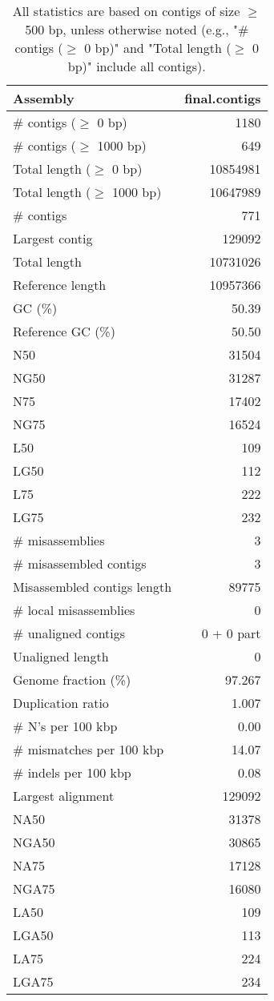\documentclass[12pt,a4paper]{article}
\begin{document}
\begin{table}[ht]
\begin{center}
\caption{All statistics are based on contigs of size $\geq$ 500 bp, unless otherwise noted (e.g., "\# contigs ($\geq$ 0 bp)" and "Total length ($\geq$ 0 bp)" include all contigs).}
\begin{tabular}{|l*{1}{|r}|}
\hline
Assembly & final.contigs \\ \hline
\# contigs ($\geq$ 0 bp) & 1180 \\ \hline
\# contigs ($\geq$ 1000 bp) & 649 \\ \hline
Total length ($\geq$ 0 bp) & 10854981 \\ \hline
Total length ($\geq$ 1000 bp) & 10647989 \\ \hline
\# contigs & 771 \\ \hline
Largest contig & 129092 \\ \hline
Total length & 10731026 \\ \hline
Reference length & 10957366 \\ \hline
GC (\%) & 50.39 \\ \hline
Reference GC (\%) & 50.50 \\ \hline
N50 & 31504 \\ \hline
NG50 & 31287 \\ \hline
N75 & 17402 \\ \hline
NG75 & 16524 \\ \hline
L50 & 109 \\ \hline
LG50 & 112 \\ \hline
L75 & 222 \\ \hline
LG75 & 232 \\ \hline
\# misassemblies & 3 \\ \hline
\# misassembled contigs & 3 \\ \hline
Misassembled contigs length & 89775 \\ \hline
\# local misassemblies & 0 \\ \hline
\# unaligned contigs & 0 + 0 part \\ \hline
Unaligned length & 0 \\ \hline
Genome fraction (\%) & 97.267 \\ \hline
Duplication ratio & 1.007 \\ \hline
\# N's per 100 kbp & 0.00 \\ \hline
\# mismatches per 100 kbp & 14.07 \\ \hline
\# indels per 100 kbp & 0.08 \\ \hline
Largest alignment & 129092 \\ \hline
NA50 & 31378 \\ \hline
NGA50 & 30865 \\ \hline
NA75 & 17128 \\ \hline
NGA75 & 16080 \\ \hline
LA50 & 109 \\ \hline
LGA50 & 113 \\ \hline
LA75 & 224 \\ \hline
LGA75 & 234 \\ \hline
\end{tabular}
\end{center}
\end{table}
\end{document}
